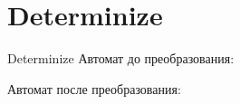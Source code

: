 \section{Determinize}
\begin{frame}{Determinize}
	Автомат до преобразования:


	Автомат после преобразования:%


\end{frame}

